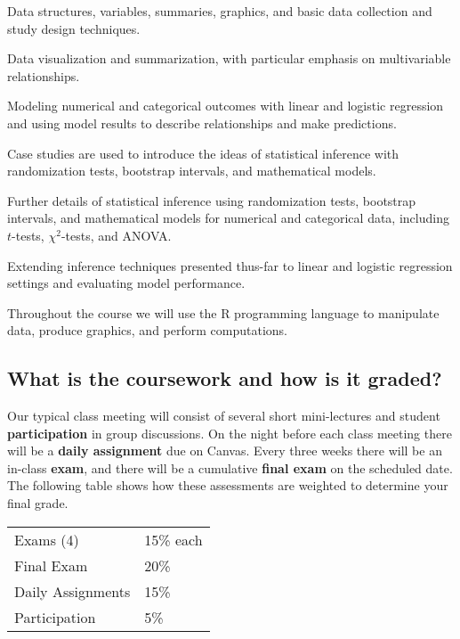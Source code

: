 \documentclass[
  twoside]{article}
\begin{document}
\begin{description}[noitemsep]
\item[Introduction to data.] Data structures, variables, summaries, graphics, and basic data collection and study design techniques.
\item[Exploratory data analysis.] Data visualization and summarization, with particular emphasis on multivariable relationships.
\item[Regression modeling.] Modeling numerical and categorical outcomes with linear and logistic regression and using model results to describe relationships and make predictions.
\item[Foundations for inference.] Case studies are used to introduce the ideas of statistical inference with randomization tests, bootstrap intervals, and mathematical models.
\item[Statistical inference.] Further details of statistical inference using randomization tests, bootstrap intervals, and mathematical models for numerical and categorical data, including $t$-tests, $\chi^2$-tests, and ANOVA.
\item[Inferential modeling.] Extending inference techniques presented thus-far to linear and logistic regression settings and evaluating model performance.
\end{description}

Throughout the course we will use the R programming language to
manipulate data, produce graphics, and perform computations.

\hypertarget{what-is-the-coursework-and-how-is-it-graded}{%
\subsection{What is the coursework and how is it
graded?}\label{what-is-the-coursework-and-how-is-it-graded}}

Our typical class meeting will consist of several short mini-lectures
and student \textbf{participation} in group discussions. On the night
before each class meeting there will be a \textbf{daily assignment} due
on Canvas. Every three weeks there will be an in-class \textbf{exam},
and there will be a cumulative \textbf{final exam} on the scheduled
date. The following table shows how these assessments are weighted to
determine your final grade.

\begin{tabular}[t]{ll}
\toprule
Exams (4) & 15\% each\\
Final Exam & 20\%\\
Daily Assignments & 15\%\\
Participation & 5\%\\
\bottomrule
\end{tabular}
\end{document}
